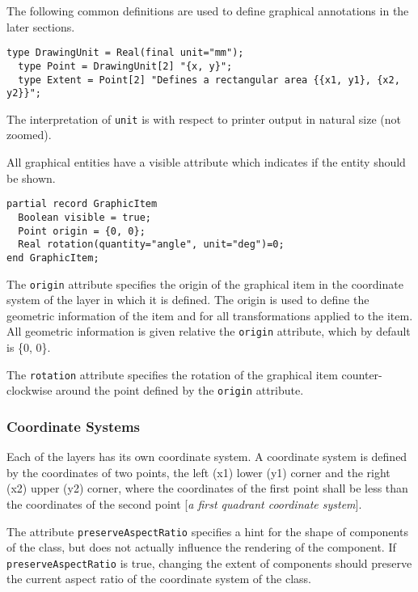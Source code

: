 The following common definitions are used to define graphical
annotations in the later sections.

\begin{lstlisting}[language=modelica]
  type DrawingUnit = Real(final unit="mm");
  type Point = DrawingUnit[2] "{x, y}";
  type Extent = Point[2] "Defines a rectangular area {{x1, y1}, {x2, y2}}";
\end{lstlisting}
The interpretation of \lstinline!unit! is with respect to printer output in
natural size (not zoomed).

All graphical entities have a visible attribute which indicates if the
entity should be shown.

\begin{lstlisting}[language=modelica]
partial record GraphicItem
  Boolean visible = true;
  Point origin = {0, 0};
  Real rotation(quantity="angle", unit="deg")=0;
end GraphicItem;
\end{lstlisting}
The \lstinline!origin! attribute specifies the origin of the graphical item in the
coordinate system of the layer in which it is defined. The origin is
used to define the geometric information of the item and for all
transformations applied to the item. All geometric information is given
relative the \lstinline!origin! attribute, which by default is \{0, 0\}.

The \lstinline!rotation! attribute specifies the rotation of the graphical item
counter-clockwise around the point defined by the \lstinline!origin! attribute.

\subsubsection{Coordinate Systems}

Each of the layers has its own coordinate system. A coordinate system is
defined by the coordinates of two points, the left (x1) lower (y1)
corner and the right (x2) upper (y2) corner, where the coordinates of
the first point shall be less than the coordinates of the second point
{[}\emph{a first quadrant coordinate system}{]}.

The attribute \lstinline!preserveAspectRatio! specifies a hint for the shape of
components of the class, but does not actually influence the rendering of the component.
If \lstinline!preserveAspectRatio! is true, changing the
extent of components should preserve the current aspect ratio of the coordinate
system of the class.

